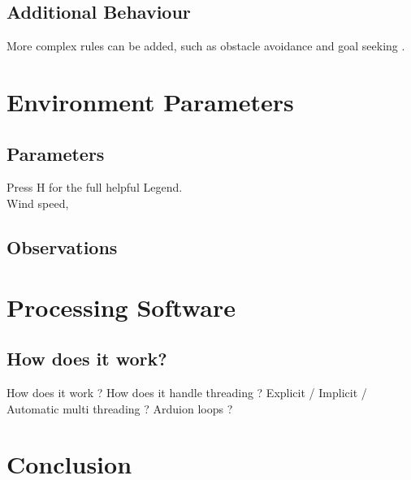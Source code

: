 \documentclass[12pt]{report}
\begin{document}
\section{Additional Behaviour}

More complex rules can be added, such as obstacle avoidance and goal seeking .\\

\chapter{Environment Parameters}
\section{Parameters}
Press H for the full helpful Legend.
\\
Wind speed,
\section{Observations}

\chapter{Processing Software}
\section{How does it work?}
How does it work ? How does it handle threading ?
Explicit / Implicit / Automatic multi threading ? Arduion loops ?

\chapter{Conclusion}







\end{document}
